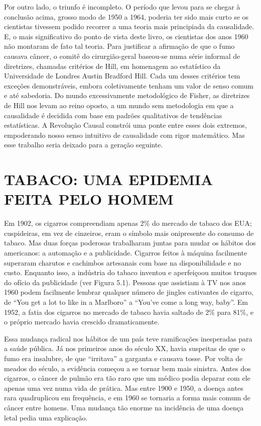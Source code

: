 \documentclass[11pt,a5paper,twoside]{book}
\begin{document}
Por outro lado, o triunfo é incompleto. O período que levou para se chegar à conclusão acima, grosso modo de 1950 a 1964, poderia ter sido mais curto se os cientistas tivessem podido recorrer a uma teoria mais principiada da causalidade. E, o mais significativo do ponto de vista deste livro, os cientistas dos anos 1960 não montaram de fato tal teoria. Para justificar a afirmação de que o fumo causava câncer, o comitê do cirurgião-geral baseou-se numa série informal de diretrizes, chamadas critérios de Hill, em homenagem ao estatístico da Universidade de Londres Austin Bradford Hill. Cada um desses critérios tem exceções demonstráveis, embora coletivamente tenham um valor de senso comum e até sabedoria. Do mundo excessivamente metodológico de Fisher, as diretrizes de Hill nos levam ao reino oposto, a um mundo sem metodologia em que a causalidade é decidida com base em padrões qualitativos de tendências estatísticas. A Revolução Causal constrói uma ponte entre esses dois extremos, empoderando nosso senso intuitivo de causalidade com rigor matemático. Mas esse trabalho seria deixado para a geração seguinte.

\section{TABACO: UMA EPIDEMIA FEITA PELO HOMEM}
Em 1902, os cigarros compreendiam apenas 2\% do mercado de tabaco dos EUA; cuspideiras, em vez de cinzeiros, eram o símbolo mais onipresente do consumo de tabaco. Mas duas forças poderosas trabalharam juntas para mudar os hábitos dos americanos: a automação e a publicidade. Cigarros feitos à máquina facilmente superaram charutos e cachimbos artesanais com base na disponibilidade e no custo. Enquanto isso, a indústria do tabaco inventou e aperfeiçoou muitos truques do ofício da publicidade (ver Figura 5.1). Pessoas que assistiam à TV nos anos 1960 podem facilmente lembrar qualquer número de jingles cativantes de cigarro, de “You get a lot to like in a Marlboro” a “You’ve come a long way, baby”. Em 1952, a fatia dos cigarros no mercado de tabaco havia saltado de 2\% para 81\%, e o próprio mercado havia crescido dramaticamente.

Essa mudança radical nos hábitos de um país teve ramificações inesperadas para a saúde pública. Já nos primeiros anos do século XX, havia suspeitas de que o fumo era insalubre, de que “irritava” a garganta e causava tosse. Por volta de meados do século, a evidência começou a se tornar bem mais sinistra. Antes dos cigarros, o câncer de pulmão era tão raro que um médico podia deparar com ele apenas uma vez numa vida de prática. Mas entre 1900 e 1950, a doença antes rara quadruplicou em frequência, e em 1960 se tornaria a forma mais comum de câncer entre homens. Uma mudança tão enorme na incidência de uma doença letal pedia uma explicação.
\end{document}
